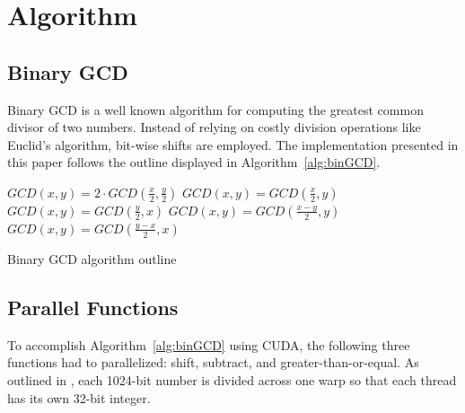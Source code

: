 \documentclass[12pt]{ucthesis}
\begin{document}


\chapter{Algorithm}
\label{sec:alg}

\section{Binary GCD}
\label{subsec:binGCD}
Binary GCD is a well known algorithm for computing the greatest common divisor 
of two numbers. Instead of relying on costly division operations like Euclid's 
algorithm, bit-wise shifts are employed. The implementation
presented in this paper follows the outline displayed in
Algorithm~\ref{alg:binGCD}.

\begin{algorithm}
   \nl{} {
      \nl{} {
         \nl$GCD(x, y) = 2 \cdot GCD(\frac{x}{2}, \frac{y}{2})$\;
      }\nl{} {
         \nl$GCD(x, y) = GCD(\frac{x}{2}, y)$\;
      }\nl{} {
         \nl$GCD(x, y) = GCD(\frac{y}{2}, x)$\;
      }\nl{} {
         \nl{} {
            \nl$GCD(x, y) = GCD(\frac{x - y}{2}, y)$\;
         }{
            \nl$GCD(x, y) = GCD(\frac{y - x}{2}, x)$\;
        }
      }
   }
   \caption{Binary GCD algorithm outline}
   \label{alg:binGCD}
\end{algorithm}

\section{Parallel Functions}
\label{subsec:parfunc}
To accomplish Algorithm~\ref{alg:binGCD} using CUDA, the following three 
functions had to parallelized: shift, subtract, and greater-than-or-equal. As 
outlined in \cite{fujimoto2009high}, each 1024-bit number is divided across one 
warp so that each thread has its own 32-bit integer. 
\end{document}
